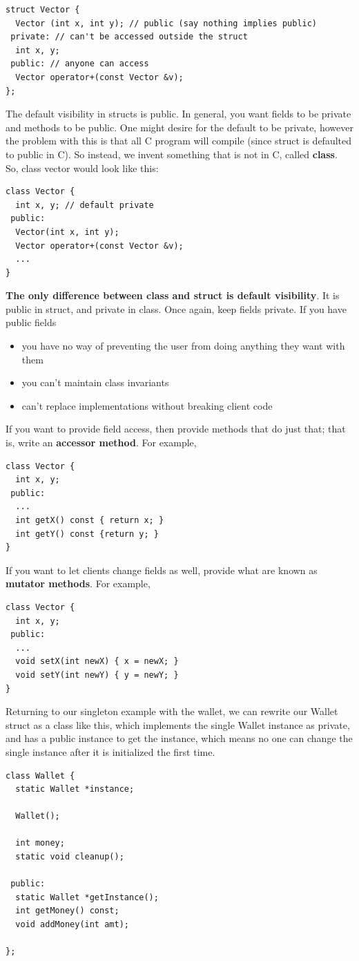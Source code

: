 \documentclass[english, 11pt]{article}
\begin{document}
\begin{lstlisting}
struct Vector {
  Vector (int x, int y); // public (say nothing implies public)
 private: // can't be accessed outside the struct
  int x, y;
 public: // anyone can access
  Vector operator+(const Vector &v);
};
\end{lstlisting}
The default visibility in structs is public. In general, you want fields to be private and methods to be public. One might desire for the default to be private, however the problem with this is that all C program will compile (since struct is defaulted to public in C). So instead, we invent something that is not in C, called \textbf{class}. So, class vector would look like this:
\begin{lstlisting}
class Vector {
  int x, y; // default private
 public:
  Vector(int x, int y);
  Vector operator+(const Vector &v);
  ...
}
\end{lstlisting}
\textbf{The only difference between class and struct is default visibility}. It is public in struct, and private in class. Once again, keep fields private. If you have public fields
\begin{itemize}
   \item you have no way of preventing the user from doing anything they want with them
   \item you can't maintain class invariants
   \item can't replace implementations without breaking client code
 \end{itemize}
If you want to provide field access, then provide methods that do just that; that is, write an \textbf{accessor method}. For example,
\begin{lstlisting}
class Vector {
  int x, y;
 public:
  ...
  int getX() const { return x; }
  int getY() const {return y; }
}
\end{lstlisting}
If you want to let clients change fields as well, provide what are known as \textbf{mutator methods}. For example,
\begin{lstlisting}
class Vector {
  int x, y;
 public:
  ...
  void setX(int newX) { x = newX; }
  void setY(int newY) { y = newY; }
}
\end{lstlisting}
Returning to our singleton example with the wallet, we can rewrite our Wallet struct as a class like this, which implements the single Wallet instance as private, and has a public instance to get the instance, which means no one can change the single instance after it is initialized the first time.
\begin{lstlisting}
class Wallet {
  static Wallet *instance;

  Wallet();

  int money;
  static void cleanup();

 public:
  static Wallet *getInstance();
  int getMoney() const;
  void addMoney(int amt);

};
\end{lstlisting}
\end{document}
